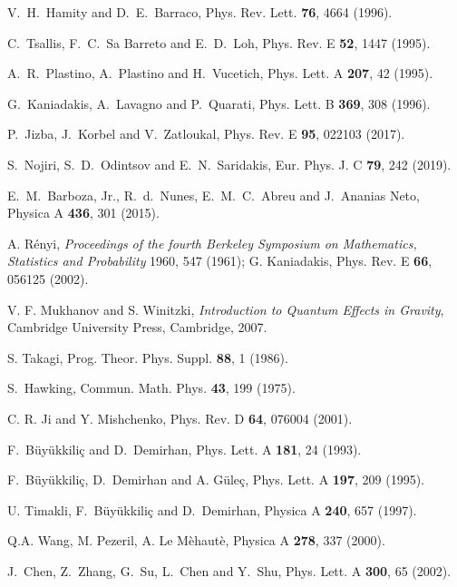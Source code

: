 \documentclass[floats,prd,aps,amssymb,nofootinbib,showkeys]{revtex4}
\begin{document}
\begin{thebibliography}{0}
V.~H.~Hamity and D.~E.~Barraco, Phys. Rev. Lett. {\bf76}, 4664 (1996).

C.~Tsallis, F.~C.~Sa Barreto and E.~D.~Loh, Phys. Rev. E {\bf 52}, 1447 (1995).

A.~R.~Plastino, A.~Plastino and H.~Vucetich, Phys. Lett. A {\bf 207},
 42 (1995).
  
G.~Kaniadakis, A.~Lavagno and P.~Quarati, Phys. Lett. B {\bf 369},
308 (1996). 

P.~Jizba, J.~Korbel and V.~Zatloukal, Phys. Rev. E {\bf 95}, 022103 (2017).

S.~Nojiri, S.~D.~Odintsov and E.~N.~Saridakis,
Eur. Phys. J. C \textbf{79}, 242 (2019).

E.~M.~Barboza, Jr., R.~d.~Nunes, E.~M.~C.~Abreu and J.~Ananias Neto,
Physica A \textbf{436}, 301 (2015). 

A. R\'enyi, \emph{Proceedings of the fourth Berkeley Symposium on Mathematics, Statistics and Probability} 1960, 547 (1961);
G. Kaniadakis, Phys. Rev. E {\bf 66}, 056125 (2002). 


 V. F. Mukhanov and S. Winitzki, \emph{Introduction to Quantum Effects in Gravity}, Cambridge University Press, Cambridge, 2007.
 
S. Takagi, Prog. Theor. Phys. Suppl. {\bf 88}, 1 (1986).

  S.~Hawking, Commun. Math. Phys. {\bf 43}, 199 (1975).

C. R. Ji and Y. Mishchenko, Phys. Rev. D {\bf64}, 076004 (2001).

  
  F.~B\"uy\"ukkili\c{c} and D.~Demirhan, Phys. Lett. A {\bf 181}, 24 (1993). 
 
F.~B\"uy\"ukkili\c{c}, D.~Demirhan and A. G\"ule\c{c}, Phys. Lett. A {\bf 197}, 209 (1995). 

U. Timakli, F.~B\"uy\"ukkili\c{c} and D.~Demirhan, Physica A {\bf 240}, 657 (1997).

Q.A. Wang, M. Pezeril, A. Le M\`ehaut\`e, Physica A {\bf 278}, 337 (2000).

J.~Chen, Z.~Zhang, G.~Su, L.~Chen and Y.~Shu,
Phys. Lett. A \textbf{300}, 65 (2002).


\end{thebibliography}
\end{document}
